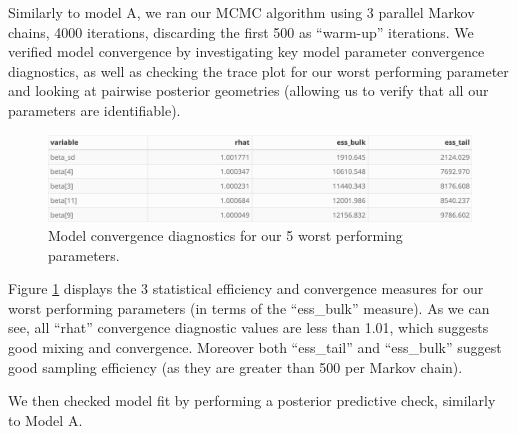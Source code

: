 \documentclass[
]{article}
\begin{document}
Similarly to model A, we ran our MCMC algorithm using 3 parallel Markov chains, 4000 iterations, discarding the first 500 as ``warm-up'' iterations. We verified model convergence by investigating key model parameter convergence diagnostics, as well as checking the trace plot for our worst performing parameter and looking at pairwise posterior geometries (allowing us to verify that all our parameters are identifiable).

\begin{figure}

{\centering \includegraphics[width=1\linewidth]{../outputs/bayesian-analysis-monthly-freq/model-no-year-effect/no-year-model-diagnostics} 

}

\caption{Model convergence diagnostics for our 5 worst performing parameters.}\label{fig:figs11}
\end{figure}

Figure \ref{fig:figs11} displays the 3 statistical efficiency and convergence measures for our worst performing parameters (in terms of the ``ess\_bulk'' measure). As we can see, all ``rhat'' convergence diagnostic values are less than 1.01, which suggests good mixing and convergence. Moreover both ``ess\_tail'' and ``ess\_bulk'' suggest good sampling efficiency (as they are greater than 500 per Markov chain).

We then checked model fit by performing a posterior predictive check, similarly to Model A.
\end{document}
